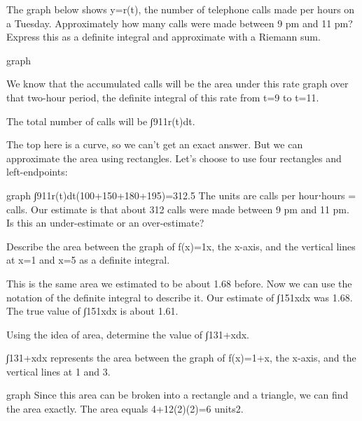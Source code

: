 \begin{example}
The graph below shows y=r(t), the number of telephone calls made per hours on a Tuesday. Approximately how many calls were made between 9 pm and 11 pm? Express this as a definite integral and approximate with a Riemann sum.

graph
\begin{solution}
We know that the accumulated calls will be the area under this rate graph over that two-hour period, the definite integral of this rate from t=9 to t=11.

The total number of calls will be ∫911r(t)dt.

The top here is a curve, so we can’t get an exact answer. But we can approximate the area using rectangles. Let's choose to use four rectangles and left-endpoints:

graph
∫911r(t)dt(100+150+180+195)=312.5
The units are calls per hour⋅hours = calls. Our estimate is that about 312 calls were made between 9 pm and 11 pm. Is this an under-estimate or an over-estimate?
\end{solution}\end{example}

\begin{example}
Describe the area between the graph of f(x)=1x, the x-axis, and the vertical lines at x=1 and x=5 as a definite integral.

\begin{solution}
This is the same area we estimated to be about 1.68 before. Now we can use the notation of the definite integral to describe it. Our estimate of ∫151xdx was 1.68. The true value of ∫151xdx is about 1.61.
\end{solution}\end{example}

\begin{example}
Using the idea of area, determine the value of ∫131+xdx.

\begin{solution}
  ∫131+xdx represents the area between the graph of f(x)=1+x, the x-axis, and the vertical lines at 1 and 3.

graph
Since this area can be broken into a rectangle and a triangle, we can find the area exactly. The area equals
4+12(2)(2)=6 units2.
\end{solution}\end{example}

